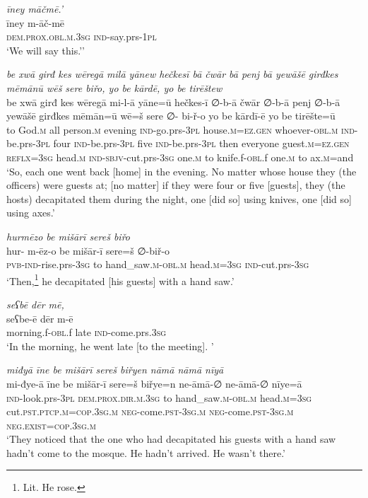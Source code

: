 \ea \label{BP.69}
\textit{īney māčmē.’} \\ 
\gll īney m-āč-mē \\ 
 \textsc{dem.prox}\textsc{.obl}\textsc{.m}\textsc{.3sg} \textsc{ind-}say.prs\textsc{-\textsc{1pl}} \\ 
\glt `We will say this.’'
\z 
 
\ea \label{BP.70}
\textit{be xwā girđ kes wēregā milā yānew hečkesī bā čwār bā penj bā yewāšē girđkes mēmānū wēš sere biřo, yo be kārdē, yo be tirēštew} \\ 
\gll be xwā girđ kes wēregā mi-l-ā yāne=ū hečkes-ī ∅-b-ā čwār ∅-b-ā penj ∅-b-ā yewāšē girđkes mēmān=ū wē=š sere ∅- bi-ř-o yo be kārdī-ē yo be tirēšte=ū \\ 
 to God\textsc{.m} all person\textsc{.m} evening \textsc{ind-}go.prs\textsc{-3pl} house\textsc{.m}\textsc{=ez.gen} whoever\textsc{-obl}\textsc{.m} \textsc{ind-}be.prs\textsc{-3pl} four \textsc{ind-}be.prs\textsc{-3pl} five \textsc{ind-}be.prs\textsc{-3pl} then everyone guest\textsc{.m}\textsc{=ez.gen} \textsc{reflx}\textsc{=3sg} head\textsc{.m} \textsc{ind-}\textsc{sbjv-}cut.prs\textsc{-3sg} one\textsc{.m} to knife.f\textsc{-obl}.f one\textsc{.m} to ax\textsc{.m}=and \\ 
\glt `So, each one went back [home] in the evening. No matter whose house they (the officers) were guests at; [no matter] if they were four or five [guests],  they  (the hosts) decapitated them during the night, one [did so] using knives, one [did so] using axes.'
\z 
 
\ea \label{BP.72}
\textit{hurmēzo be mišārī sereš biřo} \\ 
\gll hur- m-ēz-o be mišār-ī sere=š ∅-biř-o \\ 
 \textsc{pvb-}\textsc{ind-}rise.prs\textsc{-3sg} to hand\_saw\textsc{.m}\textsc{-obl}\textsc{.m} head\textsc{.m}\textsc{=3sg} \textsc{ind-}cut.prs\textsc{-3sg} \\ 
\glt `Then,\footnote{Lit. He rose.} he decapitated [his guests] with a hand saw.'
\z 
 
\ea \label{BP.74}
\textit{seʕbē dēr mē,} \\ 
\gll seʕbe-ē dēr m-ē \\ 
 morning.f\textsc{-obl}.f late \textsc{ind-}come.prs\textsc{.3sg} \\ 
\glt `In the morning, he went late [to the meeting]. '
\z 
 
\ea \label{BP.76}
\textit{miđyā īne be mišārī sereš biřyen nāmā nāmā nīyā} \\ 
\gll mi-đye-ā īne be mišār-ī sere=š biřye=n ne-āmā-∅ ne-āmā-∅ nīye=ā \\ 
 \textsc{ind-}look.prs\textsc{-3pl} \textsc{dem.prox}\textsc{.dir}\textsc{.m}\textsc{.3sg} to hand\_saw\textsc{.m}\textsc{-obl}\textsc{.m} head\textsc{.m}\textsc{=3sg} cut\textsc{.pst}\textsc{.ptcp}\textsc{.m}\textsc{=cop}\textsc{.3sg}\textsc{.m} \textsc{neg-}come\textsc{.pst}\textsc{-3sg}\textsc{.m} \textsc{neg-}come\textsc{.pst}\textsc{-3sg}\textsc{.m} \textsc{\textsc{neg.}exist}\textsc{=cop}\textsc{.3sg}\textsc{.m} \\ 
\glt `They noticed that the one who had decapitated his guests with a hand saw hadn’t come to the mosque. He hadn’t arrived. He wasn’t there.'
\z 
 
